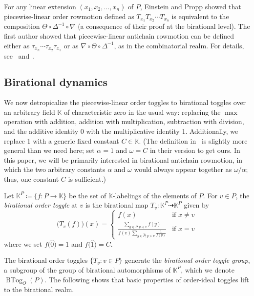\documentclass[ALCO,ThmDefs,Unicode,epreuves]{cedram}
\newcommand{\defn}[1]{\emph{#1}}
\newcommand{\kk}{\mathbb{K}}
\newcommand{\dra}{\dashrightarrow}
\newcommand{\down}{\nabla}
\newcommand{\up}{\Delta}
\DeclareMathOperator{\btog}{BTog}
\begin{document}
For any linear extension $(x_1,x_2,\dots,x_n)$ of $P$,
Einstein and Propp showed that piecewise-linear order rowmotion
defined as $T_{x_1}T_{x_2}\cdots T_{x_n}$
is equivalent to the composition $\Theta \circ \up^{-1} \circ \down$ (a consequence of
their proof at the birational level). 
The first author showed that piecewise-linear antichain rowmotion can be defined either as
$\tau_{x_n}\cdots \tau_{x_2}\tau_{x_1}$ or as
$\down\circ\Theta \circ \up^{-1}$, as in the combinatorial realm.
For details, see~\cite[\S~4, \S~6]{einpropp} and~\cite[\S~3.3, \S~3.4]{antichain-toggling}.


\subsection{Birational dynamics}

We now detropicalize the piecewise-linear order toggles to birational
toggles over an arbitrary field $\kk$ of characteristic zero in the usual way: replacing
the $\max$ operation with addition, 
addition with multiplication, 
subtraction with division, and
the additive identity 0 with the multiplicative identity 1.
Additionally, we replace 1 with a generic fixed constant $C\in\kk$.
(The definition
in~\cite{einpropp} is slightly more general than we need here; set $\alpha=1$ and
$\omega=C$ in their version to get ours. In this paper, we will be primarily interested in
birational antichain rowmotion, in which the two arbitrary constants $\alpha$ and $\omega$
would always appear together as $\omega/\alpha$; thus, one constant $C$ is sufficient.) 

\begin{defi}
Let $\kk^P\coloneqq \{f:P\rightarrow \kk \}$ be the set of $\kk$-labelings of the elements of $P$.
For $v\in P$, the \defn{birational order toggle} at $v$ is the
birational map
$T_v: \kk^P \dra \kk^P$ given by
\[
 \big(T_v(f)\big)(x) =
\begin{cases}
f(x) &\text{if }x\not=v\\[4pt]
\frac{\sum\limits_{y\in\widehat{P},y\lessdot v} f(y)}
{f(v) \sum\limits_{y\in\widehat{P},y\gtrdot v} \frac{1}{f(y)}}
&\text{if }x=v\end{cases}
\]
where we set $f\big(\widehat{0}\big)=1$ and $f\big(\widehat{1}\big)=C$.
\end{defi}
The birational order toggles $\{T_v: v\in P\}$
generate the \defn{birational order toggle group}, a subgroup of the group of
birational automorphisms of $\kk^{P}$, which we denote $\btog_O(P)$.
The following shows that basic properties of order-ideal toggles lift to the birational realm.
\end{document}

